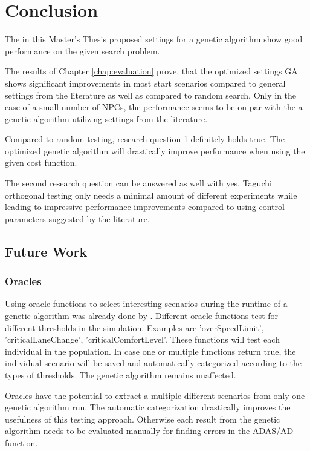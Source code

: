 \chapter{Conclusion}
The in this Master's Thesis proposed settings for a genetic algorithm show good performance on the given search problem.

The results of Chapter \ref{chap:evaluation} prove, that the optimized settings GA shows significant improvements in most start scenarios compared to general settings from the literature as well as compared to random search. Only in the case of a small number of NPCs, the performance seems to be on par with the a genetic algorithm utilizing settings from the literature.

Compared to random testing, research question 1 definitely holds true. The optimized genetic algorithm will drastically improve performance when using the given cost function.

The second research question can be answered as well with yes. Taguchi orthogonal testing only needs a minimal amount of different experiments while leading to impressive performance improvements compared to using control parameters suggested by the literature.

\section{Future Work}
\subsection{Oracles}
Using oracle functions to select interesting scenarios during the runtime of a genetic algorithm was already done by \cite{almanee_scenorita_2021}. Different oracle functions test for different thresholds in the simulation. Examples are 'overSpeedLimit', 'criticalLaneChange', 'criticalComfortLevel'. These functions will test each individual in the population. In case one or multiple functions return true, the individual scenario will be saved and automatically categorized according to the types of thresholds. The genetic algorithm remains unaffected.

Oracles have the potential to extract a multiple different scenarios from only one genetic algorithm run. The automatic categorization drastically improves the usefulness of this testing approach. Otherwise each result from the genetic algorithm needs to be evaluated manually for finding errors in the ADAS/AD function.
